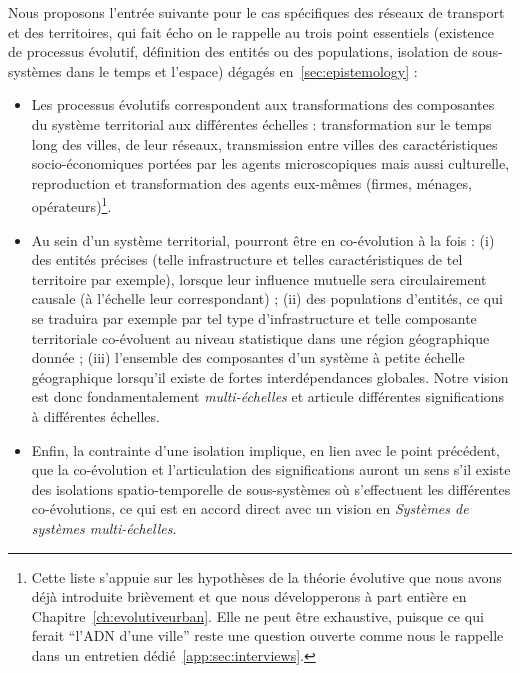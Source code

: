 Nous proposons l'entrée suivante pour le cas spécifiques des réseaux de transport et des territoires, qui fait écho on le rappelle au trois point essentiels (existence de processus évolutif, définition des entités ou des populations, isolation de sous-systèmes dans le temps et l'espace) dégagés en~\ref{sec:epistemology} :
\begin{itemize}
	\item Les processus évolutifs correspondent aux transformations des composantes du système territorial aux différentes échelles : transformation sur le temps long des villes, de leur réseaux, transmission entre villes des caractéristiques socio-économiques portées par les agents microscopiques mais aussi culturelle, reproduction et transformation des agents eux-mêmes (firmes, ménages, opérateurs)\footnote{Cette liste s'appuie sur les hypothèses de la théorie évolutive que nous avons déjà introduite brièvement et que nous développerons à part entière en Chapitre~\ref{ch:evolutiveurban}. Elle ne peut être exhaustive, puisque ce qui ferait ``l'ADN d'une ville'' reste une question ouverte comme nous le rappelle  dans un entretien dédié~\ref{app:sec:interviews}.}.
	\item Au sein d'un système territorial, pourront être en co-évolution à la fois : (i) des entités précises (telle infrastructure et telles caractéristiques de tel territoire par exemple), lorsque leur influence mutuelle sera circulairement causale (à l'échelle leur correspondant) ; (ii) des populations d'entités, ce qui se traduira par exemple par tel type d'infrastructure et telle composante territoriale co-évoluent au niveau statistique dans une région géographique donnée ; (iii) l'ensemble des composantes d'un système à petite échelle géographique lorsqu'il existe de fortes interdépendances globales. Notre vision est donc fondamentalement \emph{multi-échelles} et articule différentes significations à différentes échelles.
	\item Enfin, la contrainte d'une isolation implique, en lien avec le point précédent, que la co-évolution et l'articulation des significations auront un sens s'il existe des isolations spatio-temporelle de sous-systèmes où s'effectuent les différentes co-évolutions, ce qui est en accord direct avec un vision en \emph{Systèmes de systèmes multi-échelles}.
\end{itemize}



